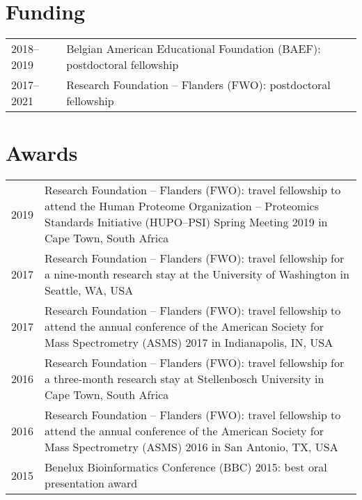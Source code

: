 \documentclass[11pt, letterpaper, roman]{moderncv}
\begin{document}
\begin{refsection}
\nocite{Bittremieux2015_ASMS1}

\printbibliography[heading=subbibliography, title={Software demonstrations}]
\end{refsection}

\def\FormatName#1{#1}


\section{Funding}

{
\renewcommand{\arraystretch}{1.25}
\setlength{\tabcolsep}{6pt}
\begin{longtable}{R{52pt}p{\textwidth-70pt}}
2018--2019 & Belgian American Educational Foundation (BAEF): postdoctoral 
fellowship\\
2017--2021 & Research Foundation -- Flanders (FWO): postdoctoral fellowship\\
\end{longtable}
}


\section{Awards}

{
\renewcommand{\arraystretch}{1.25}
\setlength{\tabcolsep}{6pt}
\begin{longtable}{R{52pt}p{\textwidth-70pt}}
2019 & Research Foundation -- Flanders (FWO): travel fellowship to attend the 
Human Proteome Organization -- Proteomics Standards Initiative (HUPO--PSI) 
Spring Meeting 2019 in Cape Town, South Africa\\
2017 & Research Foundation -- Flanders (FWO): travel fellowship for a 
nine-month research stay at the University of Washington in Seattle, WA, USA\\
2017 & Research Foundation -- Flanders (FWO): travel fellowship to attend the 
annual conference of the American Society for Mass Spectrometry (ASMS) 2017 in 
Indianapolis, IN, USA\\
2016 & Research Foundation -- Flanders (FWO): travel fellowship for a 
three-month research stay at Stellenbosch University in Cape Town, South 
Africa\\
2016 & Research Foundation -- Flanders (FWO): travel fellowship to attend the 
annual conference of the American Society for Mass Spectrometry (ASMS) 2016 in 
San Antonio, TX, USA\\
2015 & Benelux Bioinformatics Conference (BBC) 2015: best oral presentation 
award\\
\end{longtable}
}
\end{document}
